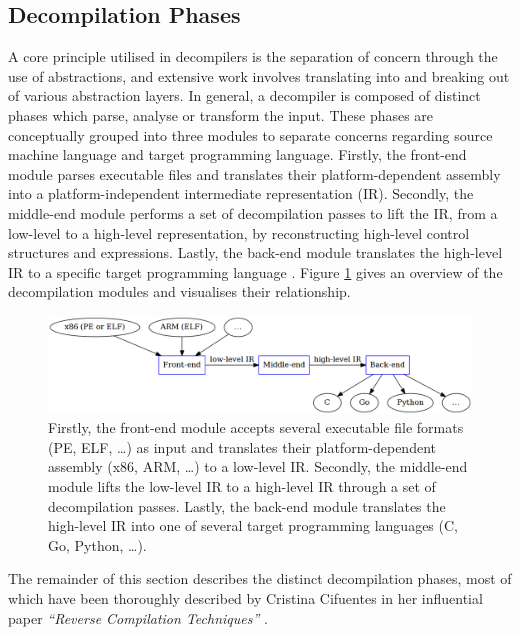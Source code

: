 
\subsection{Decompilation Phases}
\label{sec:lit_review_decompilation_phases}

A core principle utilised in decompilers is the separation of concern through the use of abstractions, and extensive work involves translating into and breaking out of various abstraction layers. In general, a decompiler is composed of distinct phases which parse, analyse or transform the input. These phases are conceptually grouped into three modules to separate concerns regarding source machine language and target programming language. Firstly, the front-end module parses executable files and translates their platform-dependent assembly into a platform-independent intermediate representation (IR). Secondly, the middle-end module performs a set of decompilation passes to lift the IR, from a low-level to a high-level representation, by reconstructing high-level control structures and expressions. Lastly, the back-end module translates the high-level IR to a specific target programming language \cite{reverse_comp}. Figure \ref{fig:modules_overview} gives an overview of the decompilation modules and visualises their relationship.

\begin{figure}[htbp]
	\begin{center}
		\includegraphics[width=\textwidth]{inc/2_lit_review/modules_overview.png}
		\caption{Firstly, the front-end module accepts several executable file formats (PE, ELF, …) as input and translates their platform-dependent assembly (x86, ARM, …) to a low-level IR. Secondly, the middle-end module lifts the low-level IR to a high-level IR through a set of decompilation passes. Lastly, the back-end module translates the high-level IR into one of several target programming languages (C, Go, Python, …).}
		\label{fig:modules_overview}
	\end{center}
\end{figure}

The remainder of this section describes the distinct decompilation phases, most of which have been thoroughly described by Cristina Cifuentes in her influential paper \textit{``Reverse Compilation Techniques''} \cite{reverse_comp}.





